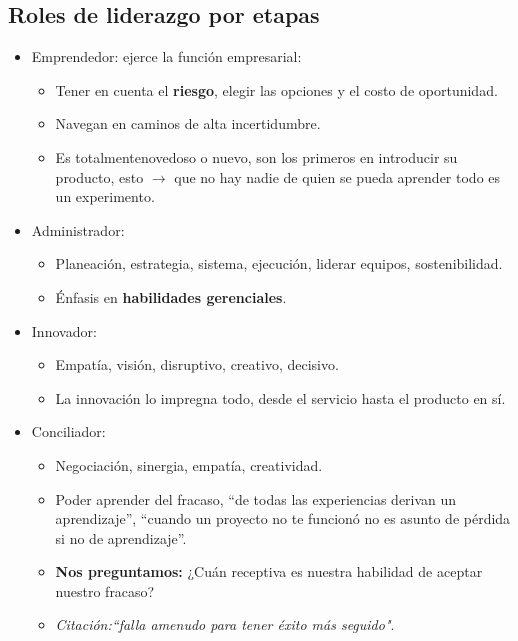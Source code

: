 \subsection{Roles de liderazgo por etapas}
\begin{itemize}
    \item Emprendedor: ejerce la función empresarial: 
        \begin{itemize}
            \item Tener en cuenta el \textbf{riesgo}, elegir las opciones y el costo de oportunidad.
            \item Navegan en caminos de alta incertidumbre.
            \item Es totalmentenovedoso o nuevo, son los primeros en introducir su producto, esto $\rightarrow$ que no hay nadie de quien se pueda aprender todo es un experimento.
        \end{itemize}

    \item Administrador: 
        \begin{itemize}
            \item Planeación, estrategia, sistema, ejecución, liderar equipos, sostenibilidad.
            \item Énfasis en \textbf{habilidades gerenciales}.
        \end{itemize}

    \item Innovador:
        \begin{itemize}
            \item Empatía, visión, disruptivo, creativo, decisivo.
            \item La innovación lo impregna todo, desde el servicio hasta el producto en sí.
        \end{itemize}
    
    \item Conciliador:
        \begin{itemize}
            \item Negociación, sinergia, empatía, creatividad.
            \item Poder aprender del fracaso, ``de todas las experiencias derivan un aprendizaje'', ``cuando un proyecto no te funcionó no es asunto de pérdida si no de aprendizaje''.
            \item \textbf{Nos preguntamos:} ¿Cuán receptiva es nuestra habilidad de aceptar nuestro fracaso?
            \item \emph{Citación:``falla amenudo para tener éxito más seguido"}.
        \end{itemize}
\end{itemize}

